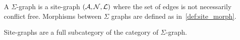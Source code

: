 
\begin{definition}
  A $\Sigma$-graph is a site-graph $(\mathcal{A},\mathcal{N},\mathcal{L})$ where the set of edges is not necessarily conflict free. Morphisms between $\Sigma$ graphs are defined as in~\autoref{def:site_morph}.
\end{definition}
Site-graphs are a full subcategory of the category of $\Sigma$-graph.


